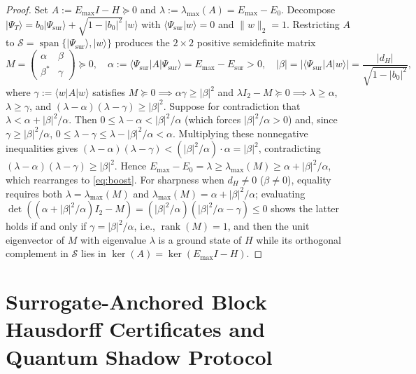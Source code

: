 \documentclass[11pt,a4paper]{article}
\theoremstyle{definition}
\DeclareMathOperator{\rank}{rank}
\newcommand{\ket}[1]{\lvert #1 \rangle}
\newcommand{\bra}[1]{\langle #1 \rvert}
\newcommand{\braket}[2]{\langle #1 \vert #2 \rangle}
\begin{document}
\begin{proof}
Set $A := E_{\max} I - H \succeq 0$ and $\lambda := \lambda_{\max}(A) = E_{\max} - E_0$. Decompose $\ket{\Psi_T} = b_0 \ket{\Psi_{\mathrm{sur}}} + \sqrt{1 - |b_0|^2}\,\ket{w}$ with $\braket{\Psi_{\mathrm{sur}}}{w} = 0$ and $\|w\|_2 = 1$. Restricting $A$ to $\mathcal{S} = \operatorname{span}\{\ket{\Psi_{\mathrm{sur}}}, \ket{w}\}$ produces the $2\times 2$ positive semidefinite matrix
\[
  M = \begin{pmatrix} \alpha & \beta \\ \beta^* & \gamma \end{pmatrix} \succeq 0, \quad
  \alpha := \bra{\Psi_{\mathrm{sur}}} A \ket{\Psi_{\mathrm{sur}}} = E_{\max} - E_{\mathrm{sur}} > 0, \quad
  |\beta| = |\bra{\Psi_{\mathrm{sur}}} A \ket{w}| = \frac{|d_H|}{\sqrt{1 - |b_0|^2}},
\]
where $\gamma := \bra{w} A \ket{w}$ satisfies $M \succeq 0 \implies \alpha\gamma \ge |\beta|^2$ and $\lambda I_2 - M \succeq 0 \implies \lambda \ge \alpha$, $\lambda \ge \gamma$, and $(\lambda - \alpha)(\lambda - \gamma) \ge |\beta|^2$.
Suppose for contradiction that $\lambda < \alpha + |\beta|^2 / \alpha$. Then $0 \le \lambda - \alpha < |\beta|^2/\alpha$ (which forces $|\beta|^2/\alpha > 0$) and, since $\gamma \ge |\beta|^2/\alpha$, $0 \le \lambda - \gamma \le \lambda - |\beta|^2/\alpha < \alpha$. Multiplying these nonnegative inequalities gives $(\lambda - \alpha)(\lambda - \gamma) < (|\beta|^2/\alpha)\cdot \alpha = |\beta|^2$, contradicting $(\lambda - \alpha)(\lambda - \gamma) \ge |\beta|^2$. Hence $E_{\max} - E_0 = \lambda \ge \lambda_{\max}(M) \ge \alpha + |\beta|^2/\alpha$, which rearranges to \eqref{eq:boost}.
For sharpness when $d_H \neq 0$ ($\beta \neq 0$), equality requires both $\lambda = \lambda_{\max}(M)$ and $\lambda_{\max}(M) = \alpha + |\beta|^2/\alpha$; evaluating $\det((\alpha + |\beta|^2/\alpha) I_2 - M) = (|\beta|^2/\alpha)(|\beta|^2/\alpha - \gamma) \le 0$ shows the latter holds if and only if $\gamma = |\beta|^2/\alpha$, i.e., $\rank(M) = 1$, and then the unit eigenvector of $M$ with eigenvalue $\lambda$ is a ground state of $H$ while its orthogonal complement in $\mathcal{S}$ lies in $\ker(A) = \ker(E_{\max} I - H)$.
\end{proof}

\section{Surrogate-Anchored Block Hausdorff Certificates and Quantum Shadow Protocol}
\end{document}
